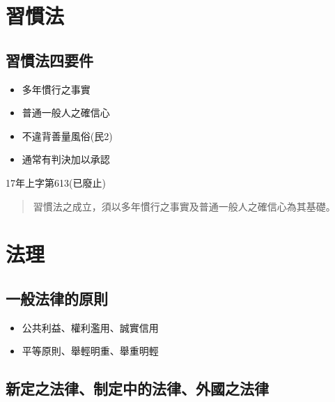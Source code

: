 \documentclass[
]{book}
\begin{document}
\hypertarget{ux7fd2ux6163ux6cd5}{%
\section{習慣法}\label{ux7fd2ux6163ux6cd5}}

\hypertarget{ux7fd2ux6163ux6cd5ux56dbux8981ux4ef6}{%
\subsection{習慣法四要件}\label{ux7fd2ux6163ux6cd5ux56dbux8981ux4ef6}}

\begin{itemize}
\item
  多年慣行之事實
\item
  普通一般人之確信心
\item
  不違背善量風俗(民2)
\item
  通常有判決加以承認
\end{itemize}

17年上字第613(已廢止)

\begin{quote}
習慣法之成立，須以多年慣行之事實及普通一般人之確信心為其基礎。
\end{quote}

\hypertarget{ux6cd5ux7406}{%
\section{法理}\label{ux6cd5ux7406}}

\hypertarget{ux4e00ux822cux6cd5ux5f8bux7684ux539fux5247}{%
\subsection{一般法律的原則}\label{ux4e00ux822cux6cd5ux5f8bux7684ux539fux5247}}

\begin{itemize}
\item
  公共利益、權利濫用、誠實信用
\item
  平等原則、舉輕明重、舉重明輕
\end{itemize}

\hypertarget{ux65b0ux5b9aux4e4bux6cd5ux5f8bux5236ux5b9aux4e2dux7684ux6cd5ux5f8bux5916ux570bux4e4bux6cd5ux5f8b}{%
\subsection{新定之法律、制定中的法律、外國之法律}\label{ux65b0ux5b9aux4e4bux6cd5ux5f8bux5236ux5b9aux4e2dux7684ux6cd5ux5f8bux5916ux570bux4e4bux6cd5ux5f8b}}
\end{document}
